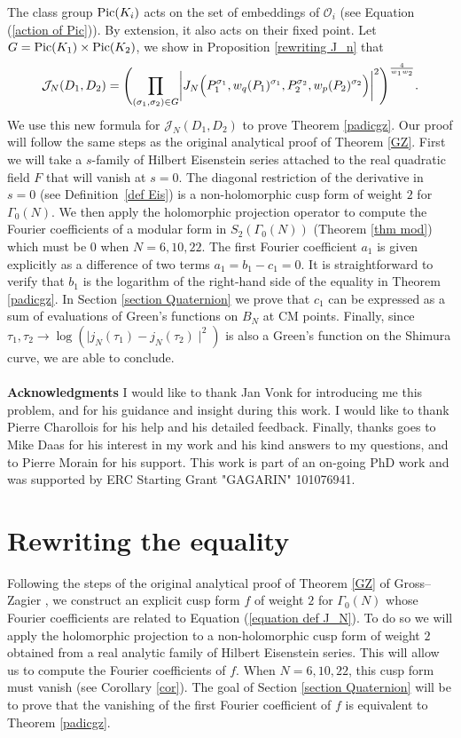 \documentclass[a4paper,12pt]{article}
\begin{document}
The class group $\textup{Pic}(K_i)$ acts on the set of embeddings of $\mathcal{O}_i$ (see Equation (\ref{action of Pic})). By extension, it also acts on their fixed point.
Let $G=\textup{Pic}(K_1)\times \textup{Pic}(K_2)$, we show in Proposition \ref{rewriting J_n} that
\begin{equation}\label{equation def J_N}
\mathcal{J}_N(D_1,D_2)
=\Biggl(\prod_{\substack{(\sigma_1,\sigma_2)\in G}}
\biggl|J_N\Bigl(P_1^{\sigma_1},w_q(P_1)^{\sigma_1},P_2^{\sigma_2},w_p(P_2)^{\sigma_2}\Bigl)\biggl|^2\Biggl)^{\frac{4}{w_1w_2}}.
\end{equation}
We use this new formula for $\mathcal{J}_N(D_1,D_2)$ to prove Theorem \ref{padicgz}.
Our proof will follow the same steps as the original analytical proof of Theorem \ref{GZ}. First we will take a $s$-family of Hilbert Eisenstein series attached to the real quadratic field $F$ that will vanish at $s=0$. The diagonal restriction of the derivative in $s=0$ (see Definition~\ref{def Eis}) is a non-holomorphic cusp form of weight $2$ for $\Gamma_0(N)$. We then apply the holomorphic projection operator to compute the Fourier coefficients of a modular form in $S_2(\Gamma_0(N))$ (Theorem \ref{thm mod}) which must be 0 when $N=6,10,22$. The first Fourier coefficient $a_1$ is given explicitly as a difference of two terms $a_1=b_1-c_1=0.$ It is straightforward to verify that $b_1$ is the logarithm of the right-hand side of the equality in Theorem \ref{padicgz}. In Section \ref{section Quaternion} we prove that $c_1$ can be expressed as a sum of evaluations of Green's functions on $B_{N}$ at CM points. Finally, since $\tau_1,\tau_2\rightarrow\log(\mid j_{N}(\tau_1)-j_{N}(\tau_2)\mid ^2)$ is also a Green's function on the Shimura curve, we are able to conclude. 
\\
\\
\textbf{Acknowledgments} I would like to thank Jan Vonk for introducing me this problem, and for his guidance and insight during this work. I would like to thank Pierre Charollois for his help and his detailed feedback. Finally, thanks goes to Mike Daas for his interest in my work and his kind answers to my questions, and to Pierre Morain for his support. This work is part of an on-going PhD work and was supported by ERC Starting Grant "GAGARIN" 101076941. 
\section{Rewriting the equality}
Following the steps of the original analytical proof of Theorem \ref{GZ} of Gross--Zagier \cite{GrossZagier84}, we construct an explicit  cusp form $f$ of weight $2$ for $\Gamma_0(N)$ whose Fourier coefficients are related to Equation (\ref{equation def J_N}). To do so we will apply the holomorphic projection to a non-holomorphic cusp form of weight $2$ obtained from a real analytic family of Hilbert Eisenstein series. This will allow us to compute the Fourier coefficients of $f$. 
 When  $N=6,10,22$, this cusp form must vanish (see Corollary \ref{cor}). The goal of Section \ref{section Quaternion} will be to prove that the vanishing of the first Fourier coefficient of $f$ is equivalent to Theorem \ref{padicgz}.
\end{document}
